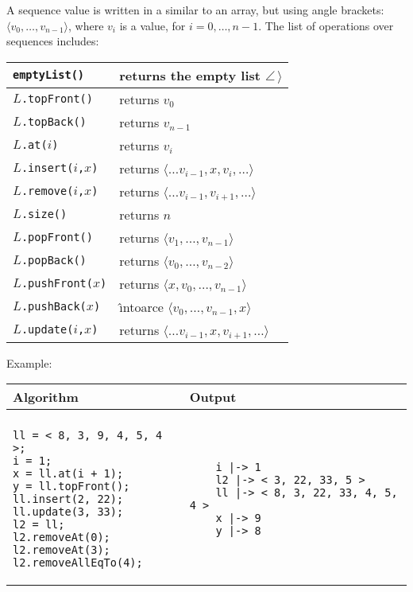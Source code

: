 \documentclass[a4paper]{report}
\begin{document}
A sequence value is written in a similar to an array, but using angle brackets: $\langle v_0,\ldots,v_{n-1}\rangle$, where $v_i$ is a value, for $i=0,\ldots,n-1$. 
The list of operations over sequences includes:
\begin{center}
\begin{tabular}{|l|l|}
\hline
\texttt{emptyList()}
&
returns the empty list $\angle\,\rangle$\\
\hline
$L$\texttt{.topFront()}
&
returns $v_0$\\
\hline
$L$\texttt{.topBack()}
&
returns $v_{n-1}$\\
\hline
$L$\texttt{.at($i$)}
&
returns $v_i$\\
\hline
$L$\texttt{.insert($i$,$x$)}
&
returns $\langle\ldots v_{i-1},x,v_i,\ldots\rangle$\\
\hline
$L$\texttt{.remove($i$,$x$)}
&
returns $\langle\ldots v_{i-1},v_{i+1},\ldots\rangle$\\
\hline
$L$\texttt{.size()}
&
returns $n$\\
\hline
 $L$\texttt{.popFront()}
&
returns $\langle v_1,\ldots,v_{n-1}\rangle$\\
\hline
$L$\texttt{.popBack()}
&
returns $\langle v_0,\ldots,v_{n-2}\rangle$\\
\hline
$L$\texttt{.pushFront($x$)}
&
returns $\langle x,v_0,\ldots,v_{n-1}\rangle$\\
\hline
$L$\texttt{.pushBack($x$)}
&
\^{\i}ntoarce $\langle v_0,\ldots,v_{n-1},x\rangle$\\
\hline
$L$\texttt{.update($i$,$x$)}
&
returns $\langle\ldots v_{i-1},x,v_{i+1},\ldots\rangle$\\
\hline
\end{tabular}
\end{center}
Example:
\begin{center}
\begin{tabular}{ll}
Algorithm & Output\\
\hline
\\
\begin{minipage}{.35\textwidth}
\begin{verbatim}
ll = < 8, 3, 9, 4, 5, 4 >;
i = 1;
x = ll.at(i + 1);
y = ll.topFront();
ll.insert(2, 22);
ll.update(3, 33);
l2 = ll;
l2.removeAt(0);
l2.removeAt(3);
l2.removeAllEqTo(4);
\end{verbatim}
\end{minipage}
&
\begin{minipage}{.55\textwidth}
\begin{verbatim}
    i |-> 1
    l2 |-> < 3, 22, 33, 5 >
    ll |-> < 8, 3, 22, 33, 4, 5, 4 >
    x |-> 9
    y |-> 8
\end{verbatim}
\end{minipage}
\end{tabular}
\end{center}
\end{document}
